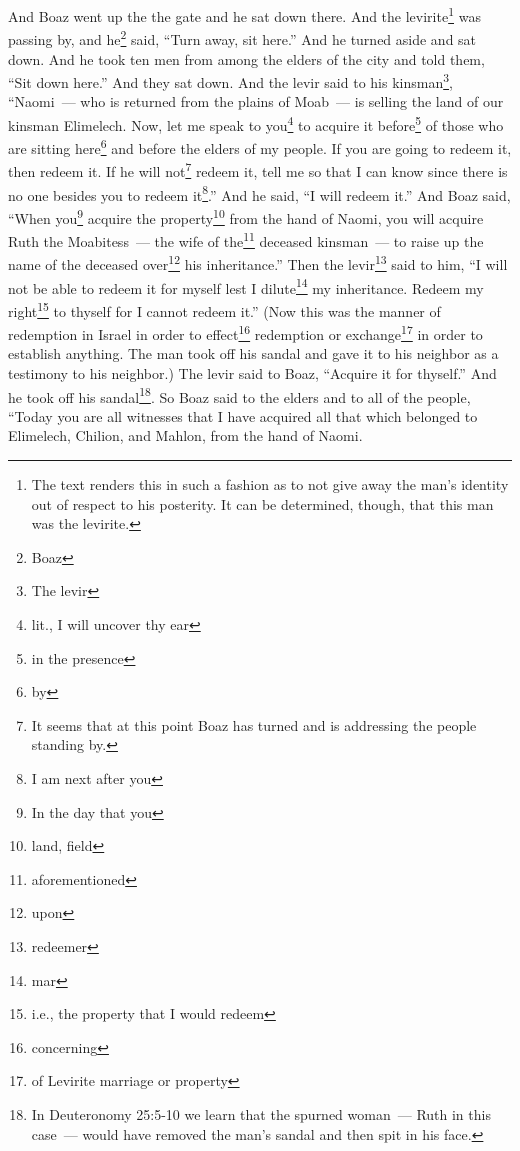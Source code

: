 
\begin{enumerate*}[mode=unboxed]
     And Boaz went up the the gate and he sat down there. And the levirite\footnote{The text renders this in such a fashion as to not give away the man's identity out of respect to his posterity. It can be determined, though, that this man was the levirite.} was passing by, and he\footnote{Boaz} said, ``Turn away, sit here.'' And he turned aside and sat down.%
     And he took ten men from among the elders of the city and told them, ``Sit down here.'' And they sat down.%
     And the levir said to his kinsman\footnote{The levir}, ``Naomi~--- who is returned from the plains of Moab~--- is selling the land of our kinsman Elimelech.%
     Now, let me speak to you\footnote{lit., I will uncover thy ear} to acquire it before\footnote{in the presence} of those who are sitting here\footnote{by} and before the elders of my people. If you are going to redeem it, then redeem it. If he will not\footnote{It seems that at this point Boaz has turned and is addressing the people standing by.} redeem it, tell me so that I can know since there is no one besides you to redeem it\footnote{I am next after you}.'' And he said, ``I will redeem it.''%
     And Boaz said, ``When you\footnote{In the day that you} acquire the property\footnote{land, field} from the hand of Naomi, you will acquire Ruth the Moabitess~--- the wife of the\footnote{aforementioned} deceased kinsman~--- to raise up the name of the deceased over\footnote{upon} his inheritance.''%
     Then the levir\footnote{redeemer} said to him, ``I will not be able to redeem it for myself lest I dilute\footnote{mar} my inheritance. Redeem my right\footnote{i.e., the property that I would redeem} to thyself for I cannot redeem it.''%
     (Now this was the manner of redemption in Israel in order to effect\footnote{concerning} redemption or exchange\footnote{of Levirite marriage or property} in order to establish anything. The man took off his sandal and gave it to his neighbor as a testimony to his neighbor.)%
     The levir said to Boaz, ``Acquire it for thyself.'' And he took off his sandal\footnote{In Deuteronomy 25:5-10 we learn that the spurned woman~--- Ruth in this case~--- would have removed the man's sandal and then spit in his face.}.%
     So Boaz said to the elders and to all of the people, ``Today you are all witnesses that I have acquired all that which belonged to Elimelech, Chilion, and Mahlon, from the hand of Naomi.%

\end{enumerate*}
